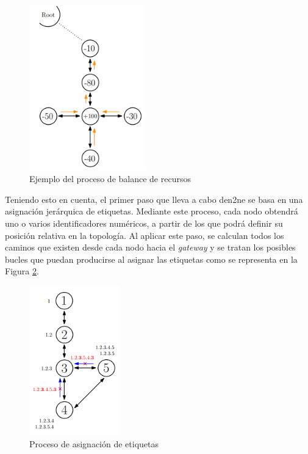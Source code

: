 \vspace{3mm}

\begin{figure}[H]
  \centering
  \includegraphics[width=0.45\textwidth]{img/teoria/balance.png}
  \caption{Ejemplo del proceso de balance de recursos \cite{den2ne}}
  \label{fig:balance}
\end{figure}

\vspace{3mm}

Teniendo esto en cuenta, el primer paso que lleva a cabo \gls{den2ne} se basa en una asignación jerárquica de etiquetas. Mediante este proceso, cada nodo obtendrá uno o varios identificadores numéricos, a partir de los que podrá definir su posición relativa en la topología. Al aplicar este paso, se calculan todos los caminos que existen desde cada nodo hacia el \textit{gateway} y se tratan los posibles bucles que puedan producirse al asignar las etiquetas como se representa en la Figura \ref{fig:bucle}.

\vspace{3mm}

\begin{figure}[h!]
  \centering
  \includegraphics[width=0.35\textwidth]{img/teoria/bucle.png}
  \caption{Proceso de asignación de etiquetas \cite{den2ne}}
  \label{fig:bucle}
\end{figure}

